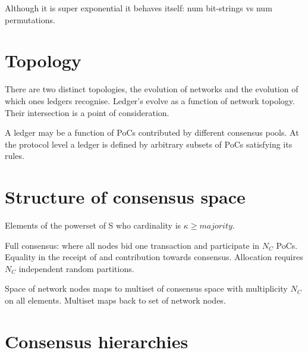 Although it is super exponential it behaves itself: num bit-strings vs num permutations.

\section{Topology}

There are two distinct topologies, the evolution of networks and the evolution of which ones ledgers recognise.
Ledger’s evolve as a function of network topology.
Their intersection is a point of consideration.

A ledger may be a function of PoCs contributed by different consensus pools. At the protocol level a ledger is defined by arbitrary subsets of PoCs satisfying its rules.

\section{Structure of consensus space}

Elements of the powerset of S who cardinality is $\kappa\geq majority$.

Full consensus: where all nodes bid one transaction and participate in $N_C$ PoCs. Equality in the receipt of and contribution towards consensus. Allocation requires $N_C$ independent random partitions.

Space of network nodes maps to multiset of consensus space with multiplicity $N_C$ on all elements. Multiset maps back to set of network nodes.

\section{Consensus hierarchies}

